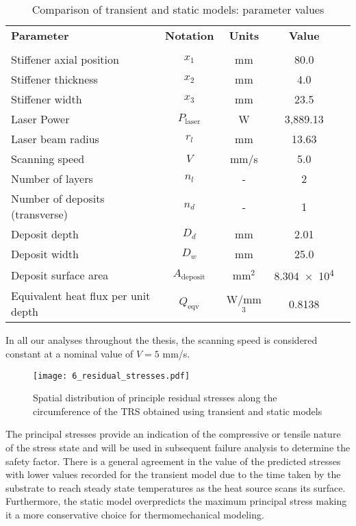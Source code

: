 \begin{table}[h!]
\centering
\renewcommand{\arraystretch}{1.0}%
\small\addtolength{\tabcolsep}{-5pt}
\caption{Comparison of transient and static models: parameter values}
\label{table:validation}
\begin{tabular}{lcccc}
\hline\hline
\bf Parameter & \bf Notation & \bf Units & \bf Value \\\\ \hline
Stiffener axial position & $x_1$ & mm & 80.0  \\
Stiffener thickness  & $x_2$ & mm & 4.0  \\
Stiffener width & $x_3$ & mm & 23.5  \\
Laser Power & $P_{\textrm{laser}}$ & W & 3,889.13 \\ 
Laser beam radius & ${r_l}$ & mm & 13.63 \\ 
Scanning speed& ${V}$ & mm/s & 5.0 \\ 
Number of layers & $n_l$ & - & 2\\
Number of deposits (transverse) & $n_d$ & - & 1\\
Deposit depth  & $D_d$ & mm & 2.01\\
Deposit width  & $D_w$ & mm & 25.0 \\
Deposit surface area  & $A_\textrm{deposit}$ & mm$^2$ & \num{8.304e4} \\
Equivalent heat flux per unit depth & $Q_\textrm{eqv}$ & W/mm$^3$ & 0.8138 \\
\hline\hline
\end{tabular}
\end{table}

In all our analyses throughout the thesis, the scanning speed is considered constant at a nominal value of $V = 5$ mm/s.

\begin{figure}[h!]
	\centering
	\texttt{[image: 6\_residual\_stresses.pdf]}
	\caption{ \label{fig:Sprinciple} Spatial distribution of principle residual stresses along the circumference of the \ac{TRS} obtained using transient and static models}
\end{figure}

The principal stresses provide an indication of the compressive or tensile nature of the stress state and will be used in subsequent failure analysis to determine the safety factor. There is a general agreement in the value of the predicted stresses with lower values recorded for the transient model due to the time taken by the substrate to reach steady state temperatures as the heat source scans its surface. Furthermore, the static model overpredicts the maximum principal stress making it a more conservative choice for thermomechanical modeling.


